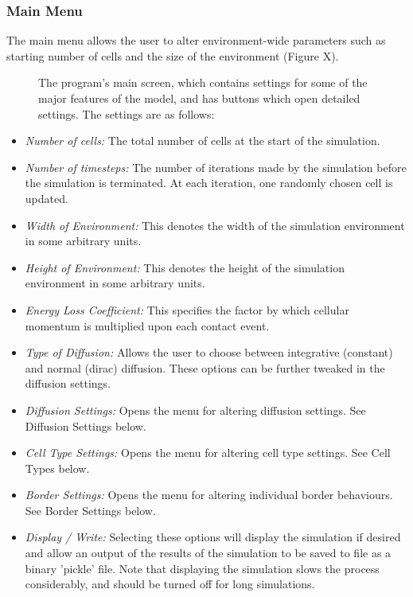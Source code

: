 \documentclass[11.5pt]{article}
\begin{document}
\subsubsection{Main Menu}

The main menu allows the user to alter environment-wide parameters such 
as starting number of cells and the size of the environment (Figure X). 



\begin{figure}[H]
\centering
\caption{The program's main screen, which contains settings 
for some of the major features of the model, and has buttons which open 
detailed settings. The settings are as follows:}
\end{figure}



\begin{itemize}
\item {\itshape Number of cells:} The total number of cells at the start 
of the simulation.
\item {\itshape Number of timesteps:} The number of iterations made by 
the simulation before the simulation is terminated. At each iteration, 
one randomly chosen cell is updated.
\item {\itshape Width of Environment:} This denotes the width of the 
simulation environment in some arbitrary units.
\item {\itshape Height of Environment:} This denotes the height of the 
simulation environment in some arbitrary units.
\item {\itshape Energy Loss Coefficient: }This specifies the factor by 
which cellular momentum is multiplied upon each contact event.
\item {\itshape Type of Diffusion:} Allows the user to choose between 
integrative (constant) and normal (dirac) diffusion. These options can 
be further tweaked in the diffusion settings.
\item {\itshape Diffusion Settings:} Opens the menu for altering 
diffusion settings. See Diffusion Settings below.
\item {\itshape Cell Type Settings: }Opens the menu for altering cell 
type settings. See Cell Types below.
\item {\itshape Border Settings: }Opens the menu for altering individual 
border behaviours. See Border Settings below.
\item {\itshape Display / Write:} Selecting these options will display 
the simulation if desired and allow an output of the results of the 
simulation to be saved to file as a binary 'pickle' file. Note that 
displaying the simulation slows the process considerably, and should be 
turned off for long simulations.
\setcounter{numberedCntG}{\theenumi}
\end{itemize}
\end{document}
